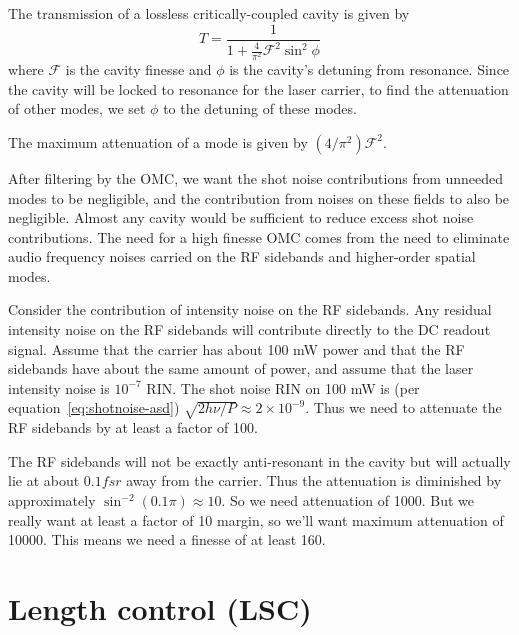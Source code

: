 The transmission of a lossless critically-coupled cavity is given by
\begin{equation}
T = \frac{1}{1 + \frac{4}{\pi^2}\mathcal{F}^2\sin^2\phi}
\end{equation}
where $\mathcal{F}$ is the cavity finesse and $\phi$ is the cavity's
detuning from resonance.  Since the cavity will be locked to resonance
for the laser carrier, to find the attenuation of other modes, we set
$\phi$ to the detuning of these modes.

The maximum attenuation of a mode is given by $(4/\pi^2)\mathcal{F}^2$.

After filtering by the OMC, we want the shot noise contributions from
unneeded modes to be negligible, and the contribution from noises on
these fields to also be negligible.  Almost any cavity would be
sufficient to reduce excess shot noise contributions.  The need for a
high finesse OMC comes from the need to eliminate audio frequency
noises carried on the RF sidebands and higher-order spatial modes.

Consider the contribution of intensity noise on the RF sidebands.  Any
residual intensity noise on the RF sidebands will contribute directly
to the DC readout signal.  Assume that the carrier has about 100 mW
power and that the RF sidebands have about the same amount of power,
and assume that the laser intensity noise is $10^{-7}$ RIN.  The shot
noise RIN on 100 mW is (per equation~\ref{eq:shotnoise-asd})
$\sqrt{2h\nu/P} \approx 2\times10^{-9}$.  Thus we need to attenuate
the RF sidebands by at least a factor of 100.

The RF sidebands will not be exactly anti-resonant in the cavity but
will actually lie at about $0.1 fsr$ away from the carrier.  Thus the
attenuation is diminished by approximately $\sin^{-2} (0.1 \pi)
\approx 10$.  So we need attenuation of 1000.  But we really want at
least a factor of 10 margin, so we'll want maximum attenuation of
10000. This means we need a finesse of at least 160.



\section{Length control (LSC)}

